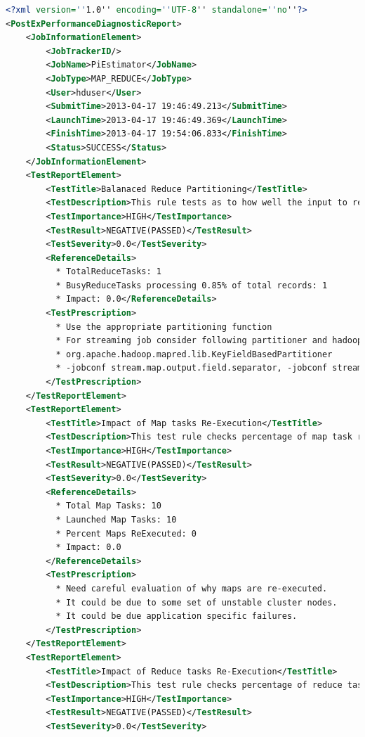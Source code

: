 \begin{lstlisting}[language=XML]
<?xml version=''1.0'' encoding=''UTF-8'' standalone=''no''?>
<PostExPerformanceDiagnosticReport>
    <JobInformationElement>
        <JobTrackerID/>
        <JobName>PiEstimator</JobName>
        <JobType>MAP_REDUCE</JobType>
        <User>hduser</User>
        <SubmitTime>2013-04-17 19:46:49.213</SubmitTime>
        <LaunchTime>2013-04-17 19:46:49.369</LaunchTime>
        <FinishTime>2013-04-17 19:54:06.833</FinishTime>
        <Status>SUCCESS</Status>
    </JobInformationElement>
    <TestReportElement>
        <TestTitle>Balanaced Reduce Partitioning</TestTitle>
        <TestDescription>This rule tests as to how well the input to reduce tasks is balanced</TestDescription>
        <TestImportance>HIGH</TestImportance>
        <TestResult>NEGATIVE(PASSED)</TestResult>
        <TestSeverity>0.0</TestSeverity>
        <ReferenceDetails>
          * TotalReduceTasks: 1
          * BusyReduceTasks processing 0.85% of total records: 1
          * Impact: 0.0</ReferenceDetails>
        <TestPrescription>
          * Use the appropriate partitioning function
          * For streaming job consider following partitioner and hadoop config parameters
          * org.apache.hadoop.mapred.lib.KeyFieldBasedPartitioner  
          * -jobconf stream.map.output.field.separator, -jobconf stream.num.map.output.key.fields
        </TestPrescription>
    </TestReportElement>
    <TestReportElement>
        <TestTitle>Impact of Map tasks Re-Execution</TestTitle>
        <TestDescription>This test rule checks percentage of map task re-execution impacting the job performance</TestDescription>
        <TestImportance>HIGH</TestImportance>
        <TestResult>NEGATIVE(PASSED)</TestResult>
        <TestSeverity>0.0</TestSeverity>
        <ReferenceDetails>
          * Total Map Tasks: 10
          * Launched Map Tasks: 10
          * Percent Maps ReExecuted: 0
          * Impact: 0.0
        </ReferenceDetails>
        <TestPrescription>
          * Need careful evaluation of why maps are re-executed.  
          * It could be due to some set of unstable cluster nodes.
          * It could be due application specific failures.
        </TestPrescription>
    </TestReportElement>
    <TestReportElement>
        <TestTitle>Impact of Reduce tasks Re-Execution</TestTitle>
        <TestDescription>This test rule checks percentage of reduce task re-execution impacting the job performance</TestDescription>
        <TestImportance>HIGH</TestImportance>
        <TestResult>NEGATIVE(PASSED)</TestResult>
        <TestSeverity>0.0</TestSeverity>

\end{lstlisting}
